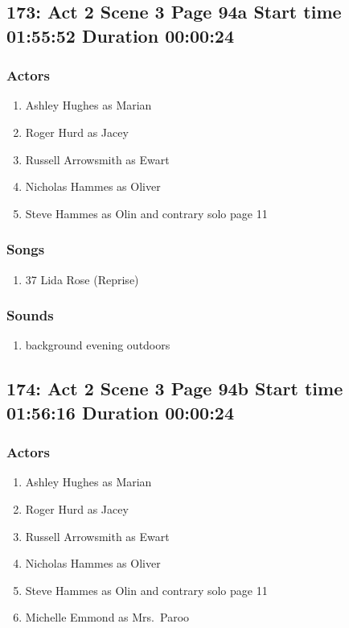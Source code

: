 \subsection{173: Act 2 Scene 3 Page 94a Start time 01:55:52 Duration 00:00:24}

\subsubsection{Actors}
\begin{enumerate}
\item Ashley Hughes as Marian
\item Roger Hurd as Jacey
\item Russell Arrowsmith as Ewart
\item Nicholas Hammes as Oliver
\item Steve Hammes as Olin and contrary solo page 11
\end{enumerate}

\subsubsection{Songs}
\begin{enumerate}
\item 37 Lida Rose (Reprise)
\end{enumerate}\subsubsection{Sounds}
\begin{enumerate}
\item background evening outdoors
\end{enumerate}
\subsection{174: Act 2 Scene 3 Page 94b Start time 01:56:16 Duration 00:00:24}

\subsubsection{Actors}
\begin{enumerate}
\item Ashley Hughes as Marian
\item Roger Hurd as Jacey
\item Russell Arrowsmith as Ewart
\item Nicholas Hammes as Oliver
\item Steve Hammes as Olin and contrary solo page 11
\item Michelle Emmond as Mrs.~Paroo
\end{enumerate}

